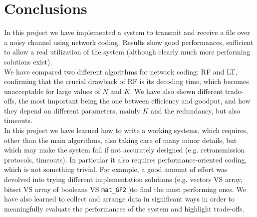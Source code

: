 \section{Conclusions}
In this project we have implemented a system to transmit and receive a file over a noisy channel using network coding. Results show good performances, sufficient to allow a real utilization of the system (although clearly much more performing solutions exist).\\
We have compared two different algorithms for network coding: RF and LT, confirming that the crucial drawback of RF is its decoding time, which becomes unacceptable for large values of $N$ and $K$. We have also shown different trade-offs, the most important being the one between efficiency and goodput, and how they depend on different parameters, mainly $K$ and the redundancy, but also timeouts.\\
In this project we have learned how to write a working systems, which requires, other than the main algorithms, also taking care of many minor details, but which may make the system fail if not accurately designed (e.g. retransmission protocols, timeouts). In particular it also requires performance-oriented coding, which is not something trivial. For example, a good amount of effort was devolved into trying different implementation solutions (e.g. vectors VS array, bitset VS array of booleans VS \texttt{mat\_GF2} )to find the most performing ones. We have also learned to collect and arrange data in significant ways in order to meaningfully evaluate the performances of the system and highlight trade-offs.

